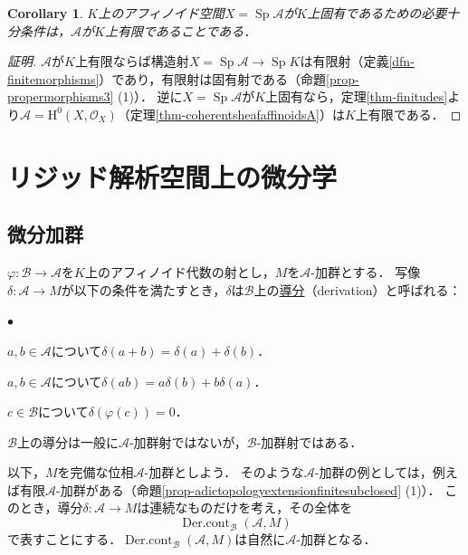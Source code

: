 \documentclass[a4paper,12pt, dvipdfmx]{jsbook}
\def\O{\mathscr{O}}
\def\Sp{\mathop{\mathrm{Sp}}\nolimits}
\def\Dercont{\mathop{\mathrm{Der.cont}}\nolimits}
\def\H{\mathrm{H}}
\renewenvironment{itemize}%
{%
   \begin{list}{\parbox{1zw}{$\bullet$}}%
   {%
      \setlength{\topsep}{.5zh}
      \setlength{\itemindent}{0zw}
      \setlength{\leftmargin}{3zw}%
      \setlength{\rightmargin}{0zw}%
      \setlength{\labelsep}{.5zw}%
      \setlength{\labelwidth}{3zw}%
      \setlength{\itemsep}{0.2em}%
      \setlength{\parsep}{0em}%
      \setlength{\listparindent}{0zw}%
   }
}{%
   \end{list}%
}
\theoremstyle{plain}
\newtheorem{cor}[thm]{\bfseries Corollary}
\theoremstyle{definition}
\begin{document}
\begin{cor}\label{cor-finitudes}{\rm 
$K$上のアフィノイド空間$X=\Sp\mathcal{A}$が$K$上固有であるための必要十分条件は，$\mathcal{A}$が$K$上有限であることである．}
\end{cor}

\begin{proof}[証明]
$\mathcal{A}$が$K$上有限ならば構造射$X=\Sp\mathcal{A}\rightarrow\Sp K$は有限射（定義\ref{dfn-finitemorphisms}）であり，有限射は固有射である（命題\ref{prop-propermorphisms3} (1)）．
逆に$X=\Sp\mathcal{A}$が$K$上固有なら，定理\ref{thm-finitudes}より$\mathcal{A}=\H^0(X,\O_X)$（定理\ref{thm-coherentsheafaffinoidsA}）は$K$上有限である．
\end{proof}

\section{リジッド解析空間上の微分学}\label{sec-differentialcalculus}
\subsection{微分加群}\label{sub-differentialmodule}
$\varphi\colon\mathcal{B}\rightarrow\mathcal{A}$を$K$上のアフィノイド代数の射とし，$M$を$\mathcal{A}$-加群とする．
写像$\delta\colon\mathcal{A}\rightarrow M$が以下の条件を満たすとき，$\delta$は$\mathcal{B}$上の\underline{導分}（derivation）と呼ばれる：
\begin{itemize}
\item[(a)] $a,b\in\mathcal{A}$について$\delta(a+b)=\delta(a)+\delta(b)$．
\item[(b)] $a,b\in\mathcal{A}$について$\delta(ab)=a\delta(b)+b\delta(a)$．
\item[(c)] $c\in\mathcal{B}$について$\delta(\varphi(c))=0$．
\end{itemize}
$\mathcal{B}$上の導分は一般に$\mathcal{A}$-加群射ではないが，$\mathcal{B}$-加群射ではある．

以下，$M$を完備な位相$\mathcal{A}$-加群としよう．
そのような$\mathcal{A}$-加群の例としては，例えば有限$\mathcal{A}$-加群がある（命題\ref{prop-adictopologyextensionfinitesubclosed} (1)）．
このとき，導分$\delta\colon\mathcal{A}\rightarrow M$は連続なものだけを考え，その全体を
$$
\Dercont_{\mathcal{B}}(\mathcal{A},M)
$$
で表すことにする．$\Dercont_{\mathcal{B}}(\mathcal{A},M)$は自然に$\mathcal{A}$-加群となる．
\end{document}
